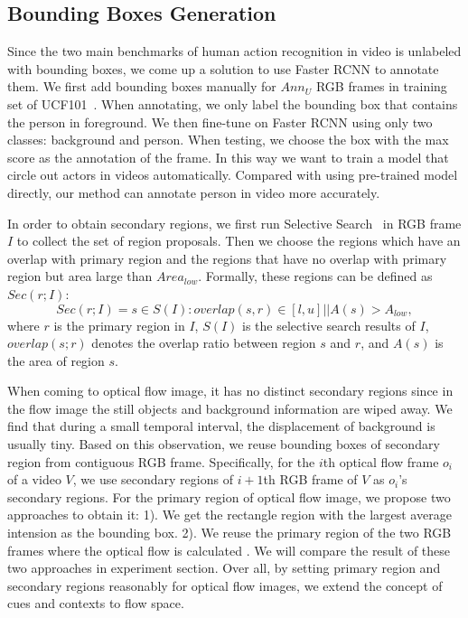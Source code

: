 \documentclass[10pt,twocolumn,letterpaper]{article}
\begin{document}
\subsection{Bounding Boxes Generation}\label{sec:obtain_bbox}
Since the two main benchmarks of human action recognition in video is unlabeled with bounding boxes,
we come up a solution to use Faster RCNN to annotate them. We first add bounding boxes manually for $Ann_{U}$ RGB frames in training set of UCF101~\cite{soomro2012ucf101}. When annotating, we only label the bounding box that contains the person in foreground. We then fine-tune on Faster RCNN using only two classes: background and person. When testing, we choose the box with the max score as the annotation of the frame. In this way we want to train a model that circle out actors in videos automatically. Compared with using pre-trained model directly, our method can annotate person in video more accurately.

In order to obtain secondary regions, we first run Selective Search~\cite{uijlings2013selective} in RGB frame $I$ to collect the set of region proposals. Then we choose the regions which have an overlap with primary region and the regions that have no overlap with primary region but  area large than $Area_{low}$. Formally, these regions can be defined as $Sec(r;I)$:
$$Sec(r;I)={s\in{S(I)}:overlap(s,r)\in{[l,u]} || A(s)>A_{low}},$$
where $r$ is the primary region in $I$, $S(I)$ is the selective search results of $I$,  $overlap(s; r)$ denotes the overlap ratio between region $s$ and $r$, and $A(s)$ is the area of region $s$.

When coming to optical flow image, it has no distinct secondary regions since in the flow image the still objects and background information are wiped away. We find that during a small temporal interval, the displacement of background is usually tiny. Based on this observation, we reuse bounding boxes of secondary region from contiguous RGB frame. Specifically, for the $i$th optical flow frame $o_{i}$ of a video $V$, we use secondary regions of $i+1$th RGB frame of $V$ as $o_{i}$'s secondary regions. For the primary region of optical flow image, we propose two approaches to obtain it: 1). We get the rectangle region with the largest average intension as the bounding box. 2). We reuse the primary region of the two RGB frames where the optical flow is calculated . We will compare the result of these two approaches in experiment section. Over all, by setting primary region and secondary regions reasonably for optical flow images, we extend the concept of cues and contexts to flow space. 
\end{document}
